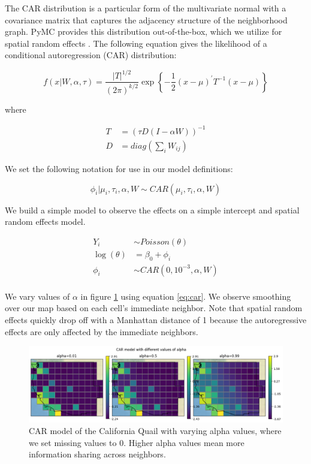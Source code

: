\documentclass[notitlepage]{article}
\begin{document}
The CAR distribution is a particular form of the multivariate normal with a covariance matrix that captures the adjacency structure of the neighborhood graph. 
PyMC provides this distribution out-of-the-box, which we utilize for spatial random effects \cite{salvatier_probabilistic_2016}.
The following equation gives the likelihood of a conditional autoregression (CAR) distribution:

\begin{equation}
f(x|W, \alpha, \tau) =
    \frac{|T|^{1/2}}{(2\pi)^{k/2}}
    \exp \left\{
        -\frac{1}{2} (x - \mu)^\prime T^{-1} (x - \mu)
    \right\}
\end{equation}

where

\begin{equation}
\begin{aligned}
    T &= (\tau D (I-\alpha W))^{-1} \\
    D &= diag(\sum_{i} W_{ij})
\end{aligned}
\end{equation}

We set the following notation for use in our model definitions:

\begin{equation}
\label{eq:car}
\phi_i | \mu_i, \tau_i, \alpha, W \sim CAR(\mu_i, \tau_i, \alpha, W)
\end{equation}

We build a simple model to observe the effects on a simple intercept and spatial random effects model.

\begin{equation}
\begin{aligned}
    Y_i &\sim Poisson(\theta) \\
    \log(\theta) &= \beta_0 + \phi_i \\
    \phi_i &\sim CAR(0, 10^{-3}, \alpha, W) \\
\end{aligned}
\end{equation}

We vary values of $\alpha$ in figure \ref{fig:alpha_car} using equation \ref{eq:car}.
We observe smoothing over our map based on each cell's immediate neighbor. 
Note that spatial random effects quickly drop off with a Manhattan distance of 1 because the autoregressive effects are only affected by the immediate neighbors.

\begin{figure}[H]
\centering
\includegraphics[width=\textwidth]{report/figures/alpha_quail.png}
\caption{CAR model of the California Quail with varying alpha values, where we set missing values to 0. Higher alpha values mean more information sharing across neighbors.}
\label{fig:alpha_car}
\end{figure}
\end{document}

